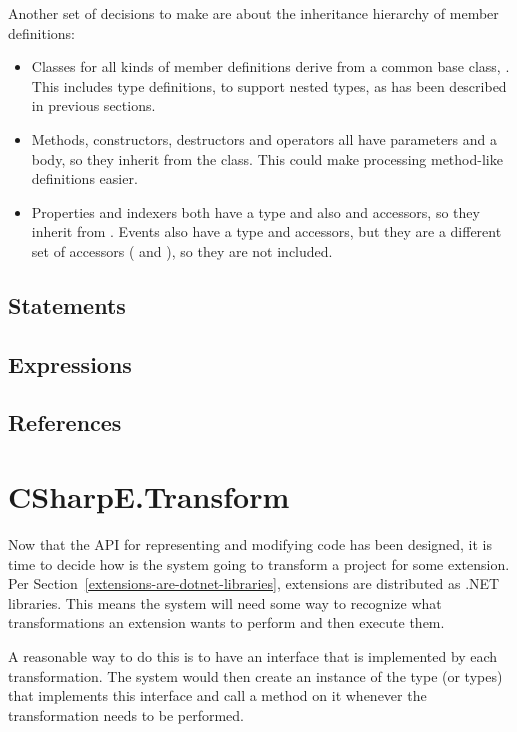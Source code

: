 \medskip

Another set of decisions to make are about the inheritance hierarchy of member definitions:

\begin{itemize}
\item Classes for all kinds of member definitions derive from a common base class, . This includes type definitions, to support nested types, as has been described in previous sections.
\item Methods, constructors, destructors and operators all have parameters and a body, so they inherit from the  class. This could make processing method-like definitions easier.
\item Properties and indexers both have a type and also  and  accessors, so they inherit from . Events also have a type and accessors, but they are a different set of accessors ( and ), so they are not included.
\end{itemize}


\subsection{Statements}

\subsection{Expressions}

\subsection{References}

\section{CSharpE.Transform}

Now that the \ac{API} for representing and modifying code has been designed, it is time to decide how is the system going to transform a project for some extension. Per Section~\ref{extensions-are-dotnet-libraries}, extensions are distributed as .NET libraries. This means the system will need some way to recognize what transformations an extension wants to perform and then execute them.

A reasonable way to do this is to have an interface that is implemented by each transformation. The system would then create an instance of the type (or types) that implements this interface and call a method on it whenever the transformation needs to be performed.


